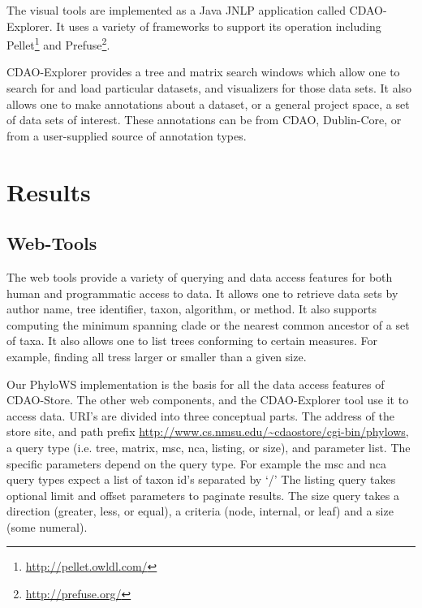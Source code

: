 \documentclass[10pt]{bmc_article}
\newenvironment{bmcformat}{\begin{raggedright}\baselineskip20pt\sloppy\setboolean{publ}{false}}{\end{raggedright}\baselineskip20pt\sloppy}
\begin{document}
\begin{bmcformat}
The visual tools are implemented as a Java JNLP application called CDAO-Explorer. It uses a variety of frameworks
to support its operation including Pellet\footnote{\url{http://pellet.owldl.com/}} and
  Prefuse\footnote{\url{http://prefuse.org/}}. 

CDAO-Explorer provides a tree and matrix search windows which allow one to search for and load particular datasets,
and visualizers for those data sets. It also allows one to make annotations about a dataset, or a general project space,
a set of data sets of interest. These annotations can be from CDAO, Dublin-Core, or from a user-supplied source of
annotation types.



 
\section*{Results}
  \subsection*{Web-Tools}
  The web tools provide a variety of querying and data access features for both human and programmatic access to
  data. It allows one to retrieve data sets by author name, tree identifier, taxon, algorithm, or method. It also
  supports computing the minimum spanning clade or the nearest common ancestor of a set of taxa. It also
  allows one to  list trees conforming to certain measures. For example, finding all tress larger or smaller than
  a given size. 

   Our PhyloWS implementation is the basis for all the data access features of CDAO-Store. The other web components,
   and the CDAO-Explorer tool use it to access data. URI's are divided into three conceptual parts. The address
   of the store site, and path prefix \url{http://www.cs.nmsu.edu/~cdaostore/cgi-bin/phylows}, a query type (i.e.
   tree, matrix, msc, nca, listing, or size), and parameter list. The specific parameters depend on the query
   type. For example the msc and nca query types expect a list of taxon id's separated by `/' The listing query
   takes optional limit and offset parameters to paginate results. The size query takes a direction 
   (greater, less, or equal),  a criteria (node, internal, or leaf) and a size (some numeral).


\end{bmcformat}
\end{document}
